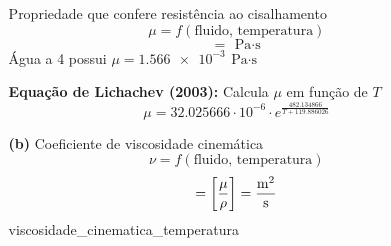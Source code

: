 \documentclass[
	a4paper, 
	12pt, 
	brazilian
]{article}
\begin{document}
\begin{itemize}
\begin{itemize}
			Propriedade que confere resistência ao cisalhamento
			\begin{equation}
			\mu=f(\textrm{fluido, temperatura})
			\end{equation}
			\begin{equation}
			[\,\mu\,]=\SI{}{\pascal\cdot\second}
			\end{equation}
			Água a \SI{4}{\SIUnitSymbolCelsius} possui $\mu=\SI{1.566e-3}{\pascal\cdot\second}$
			
			\textbf{Equação de Lichachev (2003):}
			Calcula $\mu$ em função de $T$
			\begin{equation}
			\mu=32.025666\cdot 10^{-6}\cdot e^{\frac{482.134866}{T+119.886026}}
			\end{equation}
			
			\item[\textbf{(b)}] Coeficiente de viscosidade cinemática
				\begin{equation}
					\nu=f(\textrm{fluido, temperatura})
				\end{equation}
				\begin{equation}
					[\,\nu\,]=\left[\dfrac{\mu}{\rho}\right]=\SI{}{\dfrac{\meter^{2}}{\second}}
				\end{equation}
				{viscosidade_cinematica_temperatura}
		\end{itemize}
	\end{itemize}
\end{document}
